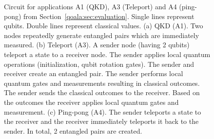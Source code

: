 \begin{figure}
    \centering

    \vspace{1cm}
    \vspace{1cm}
    \caption{
    Circuit for applications A1 (QKD), A3 (Teleport) and A4 (ping-pong) from Section~\ref{qoala:sec:evaluation}.
    Single lines represent qubits. Double lines represent classical values.
    (a) QKD (A1). Two nodes repeatedly generate entangled pairs which are immediately measured.
    (b) Teleport (A3). A sender node (having 2 qubits) teleport a state to a receiver node. The sender applies local quantum operations (initialization, qubit rotation gates).
    The sender and receiver create an entangled pair. The sender performs local quantum gates and measurements resulting in classical outcomes.
    The sender sends the classical outcomes to the receiver. Based on the outcomes the receiver applies local quantum gates and measurement.
    (c) Ping-pong (A4). The sender teleports a state to the receiver and the receiver immediately teleports it back to the sender. In total, 2 entangled pairs are created.
    }
    \label{fig:app:circuits_1}
\end{figure}

